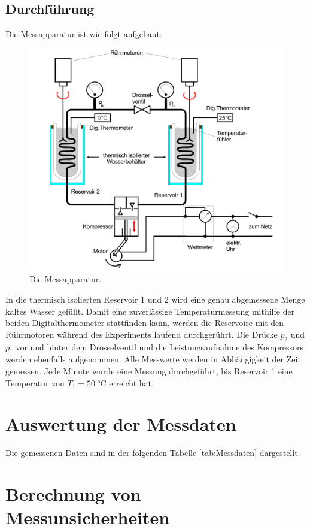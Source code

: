 \documentclass{scrartcl} %
\begin{document}
    \subsection{Durchführung}
      Die Messapparatur ist wie folgt aufgebaut:
      \begin{figure}
        \centering
        \includegraphics[scale = 0.13]{AufbauMessreihe.png}
        \caption{Die Messapparatur.}
        \label{fig:wärmepumpe2}
      \end{figure}
      In die thermisch isolierten Reservoir 1 und 2 wird eine genau abgemessene Menge kaltes Wasser gefüllt. Damit eine zuverlässige Temperaturmessung mithilfe der beiden
      Digitalthermometer stattfinden kann, werden die Reservoire mit den Rührmotoren während des Experiments laufend durchgerührt. Die Drücke $p_\text{2}$ und $p_\text{1}$
      vor und hinter dem Drosselventil und die Leistungsaufnahme des Kompressors werden ebenfalls aufgenommen. Alle Messwerte werden in Abhängigkeit der Zeit gemessen.
      Jede Minute wurde eine Messung durchgeführt, bis Reservoir 1 eine Temperatur von $T_\text{1} = \SI{50}{\celsius}$ erreicht hat.
\section{Auswertung der Messdaten}
    Die gemessenen Daten sind in der folgenden Tabelle \ref{tab:Messdaten} dargestellt.
    
    
    \section{Berechnung von Messunsicherheiten}
    
\end{document}
